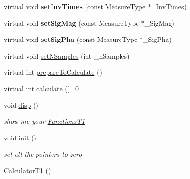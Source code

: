 \begin{DoxyCompactItemize}
\item 
\hypertarget{class_ox_1_1_calculator_t1_a102f4865fc2424e6f30bcbd5bf3580f3}{virtual void {\bfseries set\-Inv\-Times} (const Measure\-Type $\ast$\-\_\-\-Inv\-Times)}\label{class_ox_1_1_calculator_t1_a102f4865fc2424e6f30bcbd5bf3580f3}

\item 
\hypertarget{class_ox_1_1_calculator_t1_a4d0327b2105ef6b99cfacb5d37075a5a}{virtual void {\bfseries set\-Sig\-Mag} (const Measure\-Type $\ast$\-\_\-\-Sig\-Mag)}\label{class_ox_1_1_calculator_t1_a4d0327b2105ef6b99cfacb5d37075a5a}

\item 
\hypertarget{class_ox_1_1_calculator_t1_a81b313cfacfd8880e39c0e2cd87c912c}{virtual void {\bfseries set\-Sig\-Pha} (const Measure\-Type $\ast$\-\_\-\-Sig\-Pha)}\label{class_ox_1_1_calculator_t1_a81b313cfacfd8880e39c0e2cd87c912c}

\item 
virtual void \hyperlink{class_ox_1_1_calculator_t1_af5d84e582c3793ebe168f24245f04de1}{set\-N\-Samples} (int \-\_\-n\-Samples)
\item 
virtual int \hyperlink{class_ox_1_1_calculator_t1_af8b7d97caa1f197c937942c8ebc5ae7b}{prepare\-To\-Calculate} ()
\item 
virtual int \hyperlink{class_ox_1_1_calculator_t1_ab8d5ec3f03e070ca11d3accb59a92299}{calculate} ()=0
\item 
\hypertarget{class_ox_1_1_calculator_t1_ab820a5163966ce07d7be7f323ead23ae}{void \hyperlink{class_ox_1_1_calculator_t1_ab820a5163966ce07d7be7f323ead23ae}{disp} ()}\label{class_ox_1_1_calculator_t1_ab820a5163966ce07d7be7f323ead23ae}

\begin{DoxyCompactList}\small\item\em show me your \hyperlink{class_ox_1_1_functions_t1}{Functions\-T1} \end{DoxyCompactList}\item 
\hypertarget{class_ox_1_1_calculator_t1_a4f3c4edee149ea6fbba86608315f317a}{void \hyperlink{class_ox_1_1_calculator_t1_a4f3c4edee149ea6fbba86608315f317a}{init} ()}\label{class_ox_1_1_calculator_t1_a4f3c4edee149ea6fbba86608315f317a}

\begin{DoxyCompactList}\small\item\em set all the pointers to zero \end{DoxyCompactList}\item 
\hypertarget{class_ox_1_1_calculator_t1_aee286228db734cdd8c6c0686b85fa938}{\hyperlink{class_ox_1_1_calculator_t1_aee286228db734cdd8c6c0686b85fa938}{Calculator\-T1} ()}\label{class_ox_1_1_calculator_t1_aee286228db734cdd8c6c0686b85fa938}


\end{DoxyCompactItemize}
